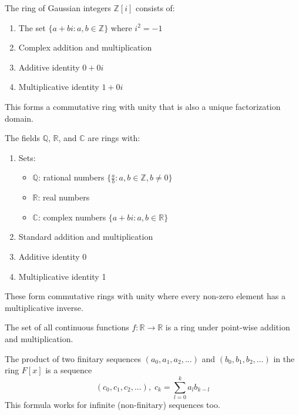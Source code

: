   \begin{definition}
    The ring of Gaussian integers $\mathbb{Z}[i]$ consists of:
    \begin{enumerate}
      \item The set $\{a + bi : a,b \in \mathbb{Z}\}$ where $i^2 = -1$
      \item Complex addition and multiplication
      \item Additive identity $0 + 0i$
      \item Multiplicative identity $1 + 0i$
    \end{enumerate}
    This forms a commutative ring with unity that is also a unique factorization domain.
  \end{definition}

  \begin{definition}
    The fields $\mathbb{Q}$, $\mathbb{R}$, and $\mathbb{C}$ are rings with:
    \begin{enumerate}
      \item Sets: 
        \begin{itemize}
          \item $\mathbb{Q}$: rational numbers $\{\frac{a}{b} : a,b \in \mathbb{Z}, b \neq 0\}$
          \item $\mathbb{R}$: real numbers
          \item $\mathbb{C}$: complex numbers $\{a + bi : a,b \in \mathbb{R}\}$
        \end{itemize}
      \item Standard addition and multiplication
      \item Additive identity 0
      \item Multiplicative identity 1
    \end{enumerate}
    These form commutative rings with unity where every non-zero element has a multiplicative inverse.
  \end{definition}

  \begin{definition}
    The set of all continuous functions $f: \mathbb{R} \rightarrow \mathbb{R}$ is a ring under point-wise addition and multiplication. 
  \end{definition}

  The product of two finitary sequences $(a_0, a_1, a_2, ...)$ and $(b_0, b_1, b_2, ...)$ in the ring $F[x]$ is a sequence 
  \begin{equation}
    (c_0, c_1, c_2, ...), \; c_k = \sum_{l = 0}^{k} a_l b_{k-l}
  \end{equation}
  This formula works for infinite (non-finitary) sequences too. 

